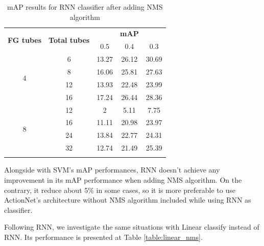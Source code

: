 \documentclass{report}
\begin{document}
\begin{center}
  \begin{longtable}{|| c | c || c c c ||}
    \hline
    \multirow{2}{*}{\textbf{FG tubes}} & \multirow{2}{*}{\textbf{Total tubes}} & {} & \textbf{mAP} & {} \\
    {} & {} & 0.5 & 0.4 & 0.3 \\
    \hline
    \multirow{4}{*}{4} & 6 & 13.27 & 26.12 & 30.69  \\
    \cline{2-5}
    {} & 8 & 16.06 & 25.81 & 27.63 \\
    \cline{2-5}
    {} & 12 & 13.93 & 22.48 & 23.99 \\
    \cline{2-5}
    {} & 16 & 17.24 & 26.44 & 28.36 \\
    \hline
    \multirow{4}{*}{8} & 12 & 2 & 5.11 & 7.75 \\
    \cline{2-5}
    {} & 16 & 11.11 & 20.98 & 23.97 \\
    \cline{2-5}
    {} & 24 & 13.84 & 22.77 & 24.31 \\
    \cline{2-5}
    {} & 32 & 12.74 & 21.49 & 25.39 \\
    \hline

  \caption{mAP results for RNN classifier after adding NMS algorithm}
  \label{table:rnn_nms}
\end{longtable}
\end{center}

Alongside with SVM's mAP performances, RNN doesn't achieve any improvement in its mAP performance when adding NMS algorithm. On the contrary, it reduce about 5\% in some cases, so it is more
preferable to use ActionNet's architecture without NMS algorithm included while using RNN as classifier. \par
Following RNN, we investigate the same situations with Linear classify instead of RNN. Its performance is presented at Table \ref{table:linear_nms}.
\end{document}
